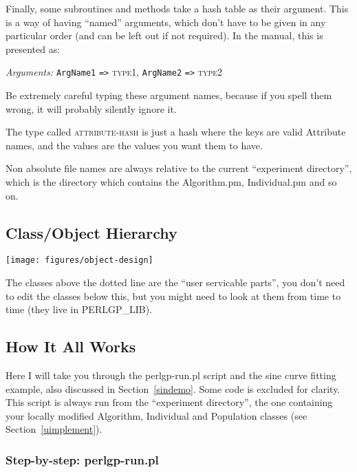 \documentclass[a4paper]{article}
\begin{document}
Finally, some subroutines and methods take a hash table as their
argument.  This is a way of having ``named'' arguments, which don't
have to be given in any particular order (and can be left out if not
required).  In the manual, this is presented as:

\begin{flushleft}
\textit{Arguments:} \texttt{ArgName1} \verb:=>: \textsc{type1}, \texttt{ArgName2} \verb:=>: \textsc{type2}\\
\end{flushleft}

Be extremely careful typing these argument names, because if you spell
them wrong, it will probably silently ignore it.

The type called \textsc{attribute-hash} is just a hash where the keys
are valid Attribute names, and the values are the values you want
them to have.

Non absolute file names are always relative to the current
``experiment directory'', which is the directory which contains the
Algorithm.pm, Individual.pm and so on.

\subsection{Class/Object Hierarchy}

\texttt{[image: figures/object-design]}

The classes above the dotted line are the ``user servicable parts'', you
don't need to edit the classes below this, but you might need to look
at them from time to time (they live in PERLGP\_LIB).

\subsection{How It All Works}\label{dataflow}

Here I will take you through the perlgp-run.pl script and the sine
curve fitting example, also discussed in Section~\ref{sindemo}.  Some
code is excluded for clarity.  This script is always run from the
``experiment directory'', the one containing your locally modified
Algorithm, Individual and Population classes (see
Section~\ref{uimplement}).

\subsubsection{Step-by-step: perlgp-run.pl}
\end{document}
